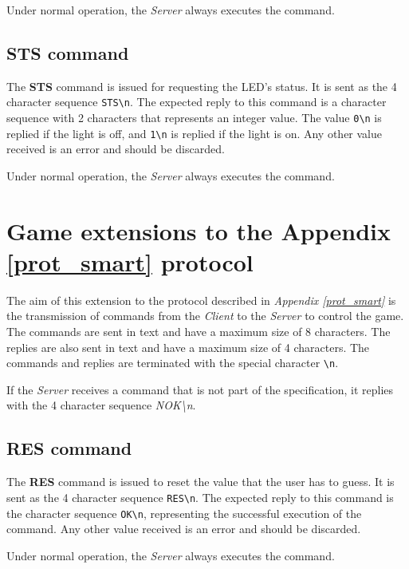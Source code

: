 \documentclass[conference, a4paper]{IEEEtran}
\begin{document}
Under normal operation, the \textit{Server} always executes the command.

\subsection{STS command}

The \textbf{STS} command is issued for requesting the LED's status. It is sent as the 4 character sequence \texttt{STS\textbackslash n}. The expected reply to this command is a character sequence with 2 characters that represents an integer value. The value \texttt{0\textbackslash n} is replied if the light is off, and \texttt{1\textbackslash n} is replied if the light is on. Any other value received is an error and should be discarded.

Under normal operation, the \textit{Server} always executes the command.

\vfill\eject

\section{Game extensions to the Appendix \ref{prot_smart} protocol}
\label{prot_smart_ext}

The aim of this extension to the protocol described in \textit{Appendix \ref{prot_smart}} is the transmission of commands from the \textit{Client} to the \textit{Server} to control the game. The commands are sent in text and have a maximum size of 8 characters. The replies are also sent in text and have a maximum size of 4 characters. The commands and replies are terminated with the special character \texttt{\textbackslash n}.

If the \textit{Server} receives a command that is not part of the specification, it replies with the 4 character sequence \textit{NOK\textbackslash n}.

\subsection{RES command}
The \textbf{RES} command is issued to reset the value that the user has to guess. It is sent as the 4 character sequence \texttt{RES\textbackslash n}. The expected reply to this command is the character sequence \texttt{OK\textbackslash n}, representing the successful execution of the command. Any other value received is an error and should be discarded.

Under normal operation, the \textit{Server} always executes the command.
\end{document}
